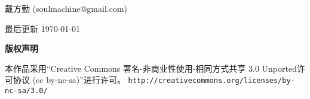 \thispagestyle{plain}
\begin{center}
  {\LARGE\textbf{\BookTitle}}

  \vspace{1em}
  {\large 戴方勤 (soulmachine@gmail.com)}

  \vspace{1ex}
  最后更新 \today

  \vspace{1em}
  \textbf{\large 版权声明}
\end{center}
\noindent 本作品采用“Creative Commons 署名-非商业性使用-相同方式共享 3.0 Unported许可协议 
(cc by-nc-sa)”进行许可。
\texttt{\small http://creativecommons.org/licenses/by-nc-sa/3.0/}

\vspace{1em}
